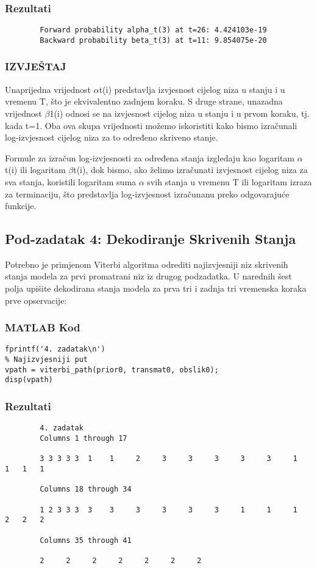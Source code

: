 \documentclass[12pt]{article}
\begin{document}
	\subsubsection*{Rezultati}
	\begin{verbatim}
		Forward probability alpha_t(3) at t=26: 4.424103e-19
		Backward probability beta_t(3) at t=11: 9.854075e-20
	\end{verbatim}
	
	\subsubsection*{IZVJEŠTAJ}
	Unaprijedna vrijednost $\alpha$t(i) predstavlja izvjesnost cijelog niza u stanju i u vremenu T, što je ekvivalentno zadnjem koraku. S druge strane, unazadna vrijednost $\beta$1(i) odnosi se na izvjesnost cijelog niza u stanju i u prvom koraku, tj. kada t=1. Oba ova skupa vrijednosti možemo iskoristiti kako bismo izračunali log-izvjesnost cijelog niza za to određeno skriveno stanje.
	
	Formule za izračun log-izvjesnosti za određena stanja izgledaju kao logaritam $\alpha$t(i) ili logaritam $\beta$t(i), dok bismo, ako želimo izračunati izvjesnost cijelog niza za sva stanja, koristili logaritam suma $\alpha$ svih stanja u vremenu T ili logaritam izraza za terminaciju, što predstavlja log-izvjesnost izračunanu preko odgovarajuće funkcije.
	
	\subsection{Pod-zadatak 4: Dekodiranje Skrivenih Stanja}
	Potrebno je primjenom Viterbi algoritma odrediti najizvjesniji niz skrivenih stanja modela za prvi promatrani niz iz drugog podzadatka. U narednih šest polja upišite dekodirana stanja modela za prva tri i zadnja tri vremenska koraka prve opservacije:
	
	\subsubsection*{MATLAB Kod}
	\begin{lstlisting}
fprintf('4. zadatak\n')     
% Najizvjesniji put
vpath = viterbi_path(prior0, transmat0, obslik0);
disp(vpath)
	\end{lstlisting}
	
	\subsubsection*{Rezultati}
	\begin{verbatim}
		4. zadatak
		Columns 1 through 17
		
		3 3 3 3 3  1    1     2     3     3     3     3     3     1   1   1   1
		
		Columns 18 through 34
		
		1 2 3 3 3  3    3     3     3     3     3     1     1     1   2   2   2
		
		Columns 35 through 41
		
		2     2     2     2     2     2     2
	\end{verbatim}
	
\end{document}
